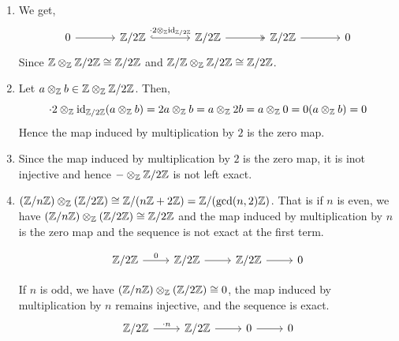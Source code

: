 \documentclass[Notebook.tex]{subfiles}
\begin{document}
\begin{solution}
    \bbni
    \begin{enumerate}
        \item We get, 
        \[
        \begin{tikzcd}[column sep=large]
        0 \arrow[r] & \Z/2\Z \arrow[r, hook, "\cdot 2 \otimes_\Z \id_{\Z/2\Z}"] &  \Z/2\Z  \arrow[r, two heads] & \Z/2\Z \arrow[r] & 0
        \end{tikzcd}
        \]
       Since $\mathbb Z \otimes_\mathbb Z \mathbb Z/2\mathbb Z \cong \mathbb Z/2\mathbb Z$ and $\mathbb Z/\mathbb Z \otimes_\mathbb Z \mathbb Z/2\mathbb Z \cong \mathbb Z/2\mathbb Z$. 

       \item Let $a \otimes_\mathbb Z b \in \mathbb Z \otimes_\mathbb Z \mathbb Z/2\mathbb Z$. Then, 
       \[\cdot 2 \otimes_\mathbb Z \operatorname{id}_{\mathbb Z/2\mathbb Z}(a \otimes_\mathbb Z b) =2a \otimes_\mathbb Z b = a \otimes_\mathbb Z 2b = a \otimes_\mathbb Z 0 = 0 (a \otimes_\mathbb Z b) = 0\]
       Hence the map induced by multiplication by $2$ is the zero map. 

       \item Since the map induced by multiplication by $2$ is the zero map, it is inot injective and hence $- \otimes_\mathbb Z \mathbb Z/2\mathbb Z$ is not left exact. 
       
       \item $(\mathbb Z/n\mathbb Z)\otimes_{\mathbb Z}(\mathbb Z/2\mathbb Z) \cong \mathbb Z/(n\mathbb Z + 2\mathbb Z) = \mathbb Z/(\gcd(n, 2)\mathbb Z)$. That is if $n$ is even, we have $(\mathbb Z/n\mathbb Z)\otimes_{\mathbb Z}(\mathbb Z/2\mathbb Z) \cong \mathbb Z/2\mathbb Z$ and the map induced by multiplication by $n$ is the zero map and the sequence is not exact at the first term.
       
       \[\begin{tikzcd} \mathbb{Z}/2\mathbb{Z} \arrow[r, "0"] & \mathbb{Z}/2\mathbb{Z} \arrow[r] & \mathbb{Z}/2\mathbb{Z} \arrow[r] & 0 \end{tikzcd}\]
       
       If $n$ is odd, we have $(\mathbb Z/n\mathbb Z)\otimes_{\mathbb Z}(\mathbb Z/2\mathbb Z) \cong 0$, the map induced by multiplication by $n$ remains injective, and the sequence is exact. 
        \[\begin{tikzcd} \mathbb{Z}/2\mathbb{Z} \arrow[r, "\cdot n"] & \mathbb{Z}/2\mathbb{Z} \arrow[r] & 0 \arrow[r] & 0 \end{tikzcd}\]
    \end{enumerate}
\end{solution}

\newpage 
\end{document}
